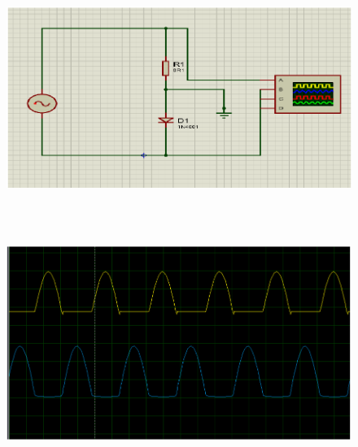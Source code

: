 \documentclass[12pt]{article}
\begin{document}
\begin{figure}[H]
	\begin{center}
		\includegraphics[width=\textwidth, height=8cm]{./images/7.11}
	\end{center}
\end{figure}

\begin{figure}[H]
	\begin{center}
		\includegraphics[width=\textwidth, height=7cm]{./images/7.12}
	\end{center}
\end{figure}
\end{document}
